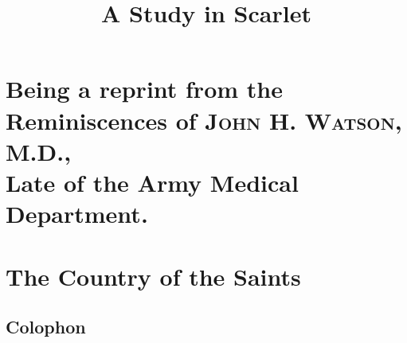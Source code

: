 \documentclass[
paper=5.5in:8.5in,
]{scrbook} %
\title{A Study in Scarlet}
\begin{document}
\frontmatter

  \begin{titlepage}
   
  \end{titlepage}



\tableofcontents



\mainmatter

\part[The Reminiscences of John H. Watson, M.D.]{Being a reprint from the Reminiscences of \textsc{John H. Watson, M.D.},\\Late of the Army Medical Department.}







\part{The Country of the Saints}









\chapter*{Colophon}
\end{document}
